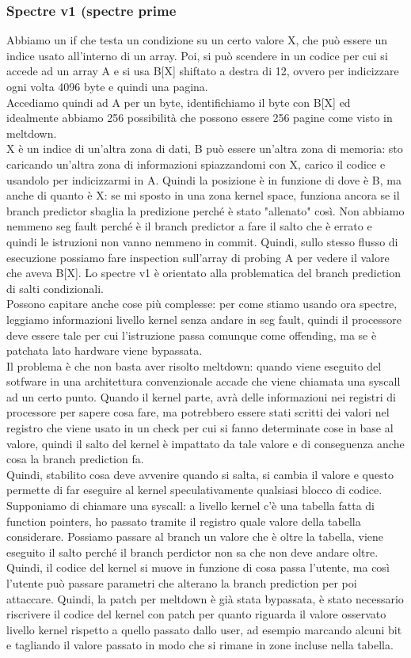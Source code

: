 \documentclass[12pt, oneside]{extbook}
\begin{document}
\subsubsection{Spectre v1 (spectre prime}
Abbiamo un if che testa un condizione su un certo valore X, che può essere un indice usato all'interno di un array. Poi, si può scendere in un codice per cui si accede ad un array A e si usa B[X] shiftato a destra di 12, ovvero per indicizzare ogni volta 4096 byte e quindi una pagina.\\ Accediamo quindi ad A per un byte, identifichiamo il byte con B[X] ed idealmente abbiamo 256 possibilità che possono essere 256 pagine come visto in meltdown.\\ X è un indice di un'altra zona di dati, B può essere un'altra zona di memoria: sto caricando un'altra zona di informazioni spiazzandomi con X, carico il codice e usandolo per indicizzarmi in A. Quindi la posizione è in funzione di dove è B, ma anche di quanto è X: se mi sposto in una zona kernel space, funziona ancora se il branch predictor sbaglia la predizione perché è stato "allenato" così. Non abbiamo nemmeno seg fault perché è il branch predictor a fare il salto che è errato e quindi le istruzioni non vanno nemmeno in commit. Quindi, sullo stesso flusso di esecuzione possiamo fare inspection sull'array di probing A per vedere il valore che aveva B[X]. Lo spectre v1 è orientato alla problematica del branch prediction di salti condizionali.\\ Possono capitare anche cose più complesse: per come stiamo usando ora spectre, leggiamo informazioni livello kernel senza andare in seg fault, quindi il processore deve essere tale per cui l'istruzione passa comunque come offending, ma se è patchata lato hardware viene bypassata.\\ Il problema è che non basta aver risolto meltdown: quando viene eseguito del sotfware in una architettura convenzionale accade che viene chiamata una syscall ad un certo punto. Quando il  kernel parte, avrà delle informazioni nei registri di processore per sapere cosa fare, ma potrebbero essere stati scritti dei valori nel registro che viene usato in un check per cui si fanno determinate cose in base al valore, quindi il salto del kernel è impattato da tale valore e di conseguenza anche cosa la branch prediction fa.\\ Quindi, stabilito cosa deve avvenire quando si salta, si cambia il valore e questo permette di far eseguire al kernel speculativamente qualsiasi blocco di codice. Supponiamo di chiamare una syscall: a livello kernel c'è una tabella fatta di function pointers, ho passato tramite il registro quale valore della tabella considerare. Possiamo passare al branch un valore che è oltre la tabella, viene eseguito il salto perché il branch perdictor non sa che non deve andare oltre. Quindi, il codice del kernel si muove in funzione di cosa passa l'utente, ma così l'utente può passare parametri che alterano la branch prediction per poi attaccare. Quindi, la patch per meltdown è già stata bypassata, è stato necessario riscrivere il codice del kernel con patch per quanto riguarda il valore osservato livello kernel rispetto a quello passato dallo user, ad esempio marcando alcuni bit e tagliando il valore passato in modo che si rimane in zone incluse nella tabella.
\end{document}
